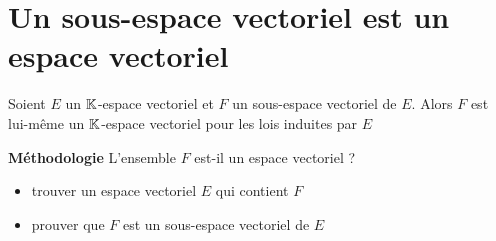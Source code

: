 \section{Un sous-espace vectoriel est un espace vectoriel}

\begin{frame}

\begin{theoreme}
\label{th:sevisev}
Soient $E$ un $\mathbb{K}$-espace vectoriel et $F$ un sous-espace vectoriel de $E$. 
Alors $F$ est lui-même un $\mathbb{K}$-espace vectoriel pour les lois
induites par $E$ 
\end{theoreme}

\pause

\bigskip
\bigskip

\textbf{Méthodologie} 
\hfil \og L'ensemble $F$ est-il un espace vectoriel ? \fg
\begin{itemize}
  \item trouver un espace vectoriel $E$ qui contient $F$
  \item prouver que $F$ est un sous-espace vectoriel de $E$
\end{itemize}

\end{frame}

